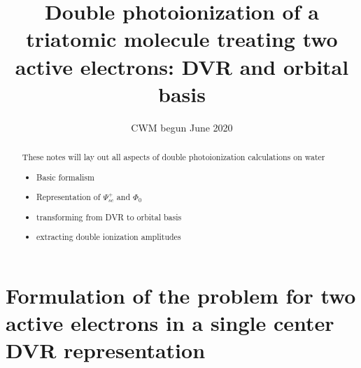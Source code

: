 \documentclass[%
pra%
,twocolumn%
,amssymb, nobibnotes, aps,
longbibliography
]{revtex4-1}
\begin{document}
\title{
Double photoionization of a triatomic molecule  treating two active electrons: DVR and orbital basis
}
\author{CWM begun June 2020 }
%
\begin{abstract}
These notes will lay out all aspects of double photoionization calculations on water
\begin{itemize}
\item {Basic formalism}
\item {Representation of $\Psi_{sc}^+$ and $\Phi_0$}
\item {transforming from DVR to orbital basis}
\item{ extracting double ionization amplitudes}
\end{itemize}   
\end{abstract}
%
\maketitle
\tableofcontents
%
%
%
\section{Formulation of the problem for two active electrons in a single center DVR representation}
\label{sec:formulation}
\end{document}
